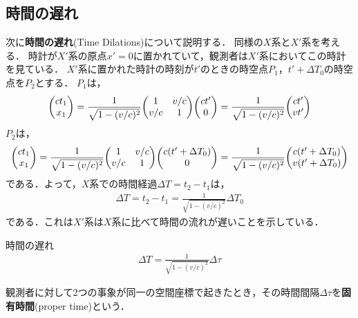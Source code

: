 \documentclass{report}
\begin{document}
  \subsection{時間の遅れ}
    次に\textbf{時間の遅れ}(Time Dilations)について説明する．
    同様の$X$系と$X'$系を考える．
    時計が$X'$系の原点$x' = 0$に置かれていて，観測者は$X'$系においてこの時計を見ている．
    $X'$系に置かれた時計の時刻が$t'$のときの時空点$P_1$，$t' + \Delta T_0$の時空点を$P_2$とする．
    $P_1$は，
    \begin{align}
      \mqty(ct_1 \\ x_1)
      =
      \frac{1}{\sqrt{1 - (v/c)^2}}
      \mqty(
        1 & v/c \\
        v/c & 1
      )
      \mqty(ct' \\ 0)
      =
      \frac{1}{\sqrt{1 - (v/c)^2}}
      \mqty(ct' \\ vt')
    \end{align}
    $P_2$は，
    \begin{align}
      \mqty(ct_1 \\ x_1)
      =
      \frac{1}{\sqrt{1 - (v/c)^2}}
      \mqty(
        1 & v/c \\
        v/c & 1
      )
      \mqty(c(t' + \Delta T_0) \\ 0)
      =
      \frac{1}{\sqrt{1 - (v/c)^2}}
      \mqty(c(t' + \Delta T_0) \\ v(t' + \Delta T_0))
    \end{align}
    である．よって，$X$系での時間経過$\Delta T = t_2 - t_1$は，
    \begin{align}
      \Delta T = t_2 - t_1 = \frac{1}{\sqrt{1 - (v/c)^2}} \Delta T_0
    \end{align}
    である．これは$X'$系は$X$系に比べて時間の流れが遅いことを示している．
    \begin{itembox}[l]{時間の遅れ}
      \begin{align}
        \Delta T = \frac{1}{\sqrt{1 - (v/c)^2}} \Delta \tau
      \end{align}
    \end{itembox}
    観測者に対して2つの事象が同一の空間座標で起きたとき，その時間間隔$\Delta \tau$を\textbf{固有時間}(proper time)という．
\end{document}
